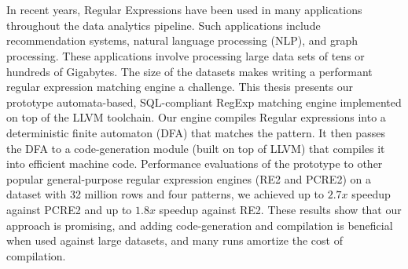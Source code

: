 \chapter{\abstractname}
In recent years, Regular Expressions have been used in many applications throughout the data analytics pipeline. Such applications include recommendation systems, natural language processing (NLP), and graph processing. These applications involve processing large data sets of tens or hundreds of Gigabytes. The size of the datasets makes writing a performant regular expression matching engine a challenge. This thesis presents our prototype automata-based, SQL-compliant RegExp matching engine implemented on top of the LLVM toolchain. Our engine compiles Regular expressions into a deterministic finite automaton (DFA) that matches the pattern. It then passes the DFA to a code-generation module (built on top of LLVM) that compiles it into efficient machine code. Performance evaluations of the prototype to other popular general-purpose regular expression engines (RE2 and PCRE2) on a dataset with 32 million rows and four patterns, we achieved up to $2.7x$ speedup against PCRE2 and up to $1.8x$ speedup against RE2. These results show that our approach is promising, and adding code-generation and compilation is beneficial when used against large datasets, and many runs amortize the cost of compilation.
